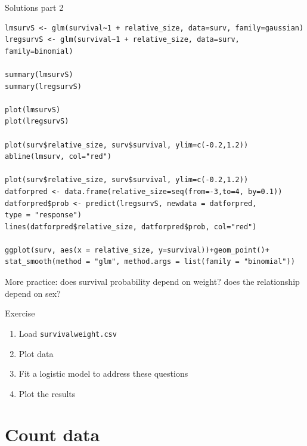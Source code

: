 \documentclass{beamer}
\makeatletter
\newenvironment{kframe}{%
 \def\at@end@of@kframe{}%
 \ifinner\ifhmode%
  \def\at@end@of@kframe{\end{minipage}}%
  \begin{minipage}{\columnwidth}%
 \fi\fi%
 \def\FrameCommand##1{\hskip\@totalleftmargin \hskip-\fboxsep
 \colorbox{shadecolor}{##1}\hskip-\fboxsep
     \hskip-\linewidth \hskip-\@totalleftmargin \hskip\columnwidth}%
 \MakeFramed {\advance\hsize-\width
   \@totalleftmargin\z@ \linewidth\hsize
   \@setminipage}}%
 {\par\unskip\endMakeFramed%
 \at@end@of@kframe}
\newenvironment{knitrout}{}{} %
\makeatother
\begin{document}
\begin{frame}[fragile]{Solutions part 2}
     
\begin{knitrout}
\color{fgcolor}\begin{kframe}
\footnotesize
\begin{verbatim}
lmsurvS <- glm(survival~1 + relative_size, data=surv, family=gaussian)
lregsurvS <- glm(survival~1 + relative_size, data=surv, family=binomial)

summary(lmsurvS)
summary(lregsurvS)

plot(lmsurvS)
plot(lregsurvS)

plot(surv$relative_size, surv$survival, ylim=c(-0.2,1.2))
abline(lmsurv, col="red")

plot(surv$relative_size, surv$survival, ylim=c(-0.2,1.2))
datforpred <- data.frame(relative_size=seq(from=-3,to=4, by=0.1))
datforpred$prob <- predict(lregsurvS, newdata = datforpred,
type = "response")
lines(datforpred$relative_size, datforpred$prob, col="red")

ggplot(surv, aes(x = relative_size, y=survival))+geom_point()+
stat_smooth(method = "glm", method.args = list(family = "binomial"))

\end{verbatim}
\end{kframe}
\end{knitrout}
\end{frame}


\begin{frame}{More practice: does survival probability depend on weight? does the relationship depend on sex?}
 
  \begin{exampleblock}{Exercise}
    \begin{enumerate}
      \item Load \texttt{survivalweight.csv}
      \item Plot data
      \item Fit a logistic model to address these questions
      \item Plot the results
    \end{enumerate}
  \end{exampleblock}
 \end{frame}


\section{Count data}
\end{document}
